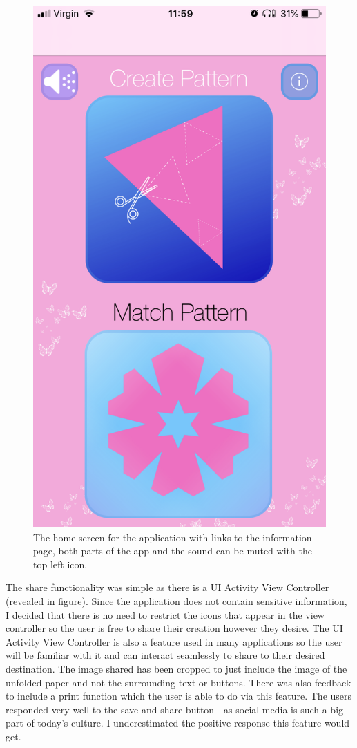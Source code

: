 \documentclass[11pt]{article}
\begin{document}
\begin{figure}[!ht]
\begin{minipage}{0.45\textwidth}
                            \includegraphics[width=0.7\linewidth]{KiriZen/main.png}
                            \caption{The home screen for the application with links to the information page, both parts of the app and the sound can be muted with the top left icon.}
                            \label{fig:kiriZen-main}
                        \end{minipage}
                    \end{figure}
                
                The share functionality was simple as there is a UI Activity View Controller (revealed in figure). Since the application does not contain sensitive information, I decided that there is no need to restrict the icons that appear in the view controller so the user is free to share their creation however they desire. The UI Activity View Controller is also a feature used in many applications so the user will be familiar with it and can interact seamlessly to share to their desired destination. The image shared has been cropped to just include the image of the unfolded paper and not the surrounding text or buttons. There was also feedback to include a print function which the user is able to do via this feature. The users responded very well to the save and share button - as social media is such a big part of today's culture. I underestimated the positive response this feature would get.
            
\end{document}
